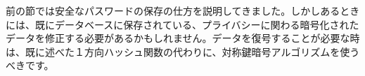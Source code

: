 前の節では安全なパスワードの保存の仕方を説明してきました。しかしあるときには、既にデータベースに保存されている、プライバシーに関わる暗号化されたデータを修正する必要があるかもしれません。データを復号することが必要な時は、既に述べた１方向ハッシュ関数の代わりに、対称鍵暗号アルゴリズムを使うべきです。
